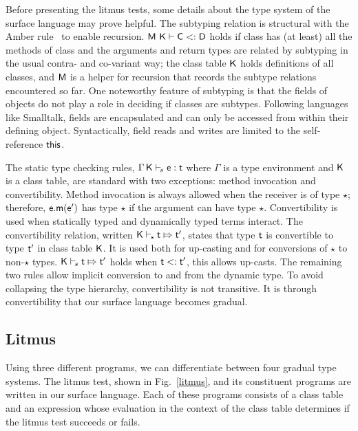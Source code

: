 \documentclass[a4paper,USenglish]{lipics-v2018}
\newcommand{\EM}[1]{\ensuremath{#1}\xspace}
\newcommand{\xt}[1]{{\sf{#1}}}
\newcommand{\EMxt}[1]{\EM{\xt{#1}}}
\newcommand{\m}{\EMxt m}
\newcommand{\K}{\EMxt K}
\newcommand{\M}{\EMxt{M}}
\newcommand{\Env}{\EM{\Gamma}}
\newcommand{\any}{\EM{\star}}
\newcommand{\this}{\EMxt{this}}
\newcommand{\Sub}{\EM{<:}}
\newcommand{\ConvertE}[4]{\EM{#1 \vdash_{\!s} #3 \Mapsto #4}}
\newcommand{\StrSub}[4]{\EM{#1~#2\vdash #3\Sub #4}}
\newcommand{\EnvTypeS}[4]{ \EM{#1\,#2\vdash_{\!s} #3 : #4}}
\newcommand{\figref}[1]{Fig.~\ref{#1}\xspace}
\newcounter{rules}
\begin{document}
\enlargethispage{-1\baselineskip}
Before presenting the litmus tests, some details about the type system of the
surface language may prove helpful. The subtyping relation is structural
with the Amber rule~\cite{cardelli1985amber} to enable recursion. \StrSub\M\K\C\D holds if class
\C has (at least) all the methods of class \D and the arguments and return
types are related by subtyping in the usual contra- and co-variant way; the
class table \K holds definitions of all classes, and \M is a helper for
recursion that records the subtype relations encountered so far. One noteworthy feature of subtyping is that the fields of objects
do not play a role in deciding if classes are subtypes. Following languages
like Smalltalk, fields are encapsulated and can only be accessed from within their
defining object. Syntactically, field reads and writes are limited to
the self-reference \this. 

The static type checking rules, \EnvTypeS \Env\K\e\t where \Env is 
a type environment and \K is a class table,
are standard with two exceptions: method invocation and convertibility. 
Method invocation is always allowed when the receiver \e is of 
type \any; therefore, \EM{\e.\m(\ep)} has type \any if the argument
can have type \any. Convertibility 
is used when statically typed and dynamically typed terms
interact. The convertibility relation, written $\ConvertE\K s\t\tp$, states
that type $\t$ is convertible to type $\tp$ in class table \K. It
is used both for up-casting and for conversions of \any to non-\any types.
$\ConvertE\K s\t\tp$ holds when $\t\Sub\tp$, this allows up-casts. The
remaining two rules allow implicit conversion to and from the dynamic type.
To avoid collapsing the type hierarchy, convertibility is not transitive.
It is through convertibility that our surface language becomes gradual.

\subsection{Litmus}

Using three different programs, we can differentiate between four gradual
type systems. The litmus test, shown in \figref{litmus}, and its
constituent programs are written in our surface language. Each of these
programs consists of a class table and an expression whose evaluation in
the context of the class table determines if the litmus test succeeds or
fails.
\end{document}
